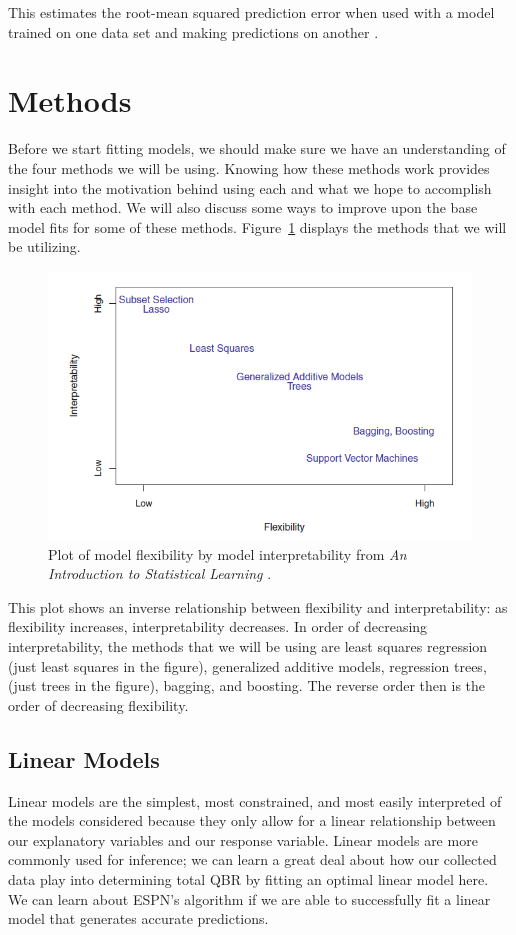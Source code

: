 \documentclass[12pt]{article}\usepackage[]{graphicx}\usepackage[]{color}
\begin{document}
This estimates the root-mean squared prediction error when used with a model trained on one data set and making predictions on another \cite{gam}.

\section{Methods}
Before we start fitting models, we should make sure we have an understanding of the four methods we will be using. Knowing how these methods work provides insight into the motivation behind using each and what we hope to accomplish with each method. We will also discuss some ways to improve upon the base model fits for some of these methods. Figure~\ref{fig:flexinterp} displays the methods that we will be utilizing.

\begin{figure}[h]
	\centering
	\includegraphics[width=\textwidth]{flexinterp.png}
	\captionsetup{font=footnotesize,labelfont=footnotesize}
	\caption{\label{fig:flexinterp} Plot of model flexibility by model interpretability from \textit{An Introduction to Statistical Learning} \cite{gam}.}
\end{figure}

\newpage
This plot shows an inverse relationship between flexibility and interpretability: as flexibility increases, interpretability decreases. In order of decreasing interpretability, the methods that we will be using are least squares regression (just least squares in the figure), generalized additive models, regression trees, (just trees in the figure), bagging, and boosting. The reverse order then is the order of decreasing flexibility.

\subsection{Linear Models}
Linear models are the simplest, most constrained, and most easily interpreted of the models considered because they only allow for a linear relationship between our explanatory variables and our response variable. Linear models are more commonly used for inference; we can learn a great deal about how our collected data play into determining total QBR by fitting an optimal linear model here. We can learn about ESPN's algorithm if we are able to successfully fit a linear model that generates accurate predictions.
\end{document}
